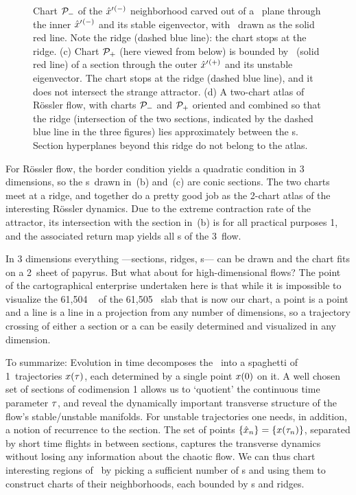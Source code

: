 \documentclass[aip,cha,reprint,
secnumarabic,
nofootinbib, tightenlines,
nobibnotes, showkeys, showpacs,
groupedaddress
]{revtex4-1}
\begin{document}
\begin{figure}
{ Chart ${\cal P}_{-}$ of the ${\hat{x}'}{}^{(-)}$ neighborhood carved out of a
 \PoincSec\ plane through the inner {\eqv} ${\hat{x}'}{}^{(-)}$ and its
 stable eigenvector, with \poincBord\ drawn as the solid red line.
 Note the ridge
 (dashed blue line): the chart stops at the ridge.
(c)
  Chart ${\cal P}_{+}$ (here viewed from below) is bounded by \poincBord\
  (solid red line) of a section through the outer {\eqv}
  ${\hat{x}'}{}^{(+)}$  and its unstable eigenvector. The chart stops at the
  ridge (dashed blue line), and it does not intersect the strange
  attractor.
(d)
  A two-chart atlas of R\"ossler flow, with charts ${\cal P}_{-}$ and
  ${\cal P}_{+}$ oriented and combined so that the ridge (intersection of
  the two sections, indicated by the dashed blue line in the three
  figures) lies approximately between the \template s. Section
  hyperplanes beyond this ridge do not belong to the atlas.
    }
\label{fig:RoessTrjs}
\end{figure}

For R\"ossler flow, the border condition  yields a
quadratic condition in 3 dimensions, so the \poincBord s\ drawn in
\,(b) and \reffig{fig:RoessTrjs}\,(c) are conic
sections. The two charts meet at a ridge, and together do a pretty good
job as the 2-chart atlas of the interesting R\"ossler dynamics. Due to the
extreme contraction rate of the attractor, its intersection with
the section in
\,(b) is for all practical purposes 1\dmn, and the
associated return map yields all \po s of the 3\dmn\ flow.\rf{DasBuch}

In 3 dimensions everything ---sections, ridges, \poincBord s--- can be
drawn and the chart fits on a 2\dmn\ sheet of
papyrus. But what about for high-dimensional flows? The point of the
cartographical enterprise undertaken here is that while it is impossible to
visualize the 61,504%
\dmn\ {\poincBord} of the 61,505%
\dmn\ slab that is now our chart, a point is a point
and a line is a line in a projection from any number of dimensions, so a
trajectory crossing of either a section or a {\poincBord} can be easily
determined and visualized in any dimension.

To summarize:
Evolution in time decomposes the \statesp\ into a spaghetti of 1\dmn\
trajectories $x(\tau)$, each determined by a single point $x(0)$
on it. A well chosen set of {sections} of codimension 1 allows us to
`quotient' the continuous time parameter $\tau$, and reveal the
dynamically important transverse structure of the flow's stable/unstable
manifolds. For unstable trajectories one needs, in addition, a notion of
recurrence to the section. The set of points $\{\hat{x}_n\} =
\{x(\tau_n)\}$,  separated by short time flights in between sections,
captures the transverse dynamics without losing any information about the
chaotic flow. We can thus chart interesting regions of \statesp\ by
picking a sufficient number of \template s and using them to construct
charts of their neighborhoods, each bounded by \poincBord s and ridges.
\end{document}
